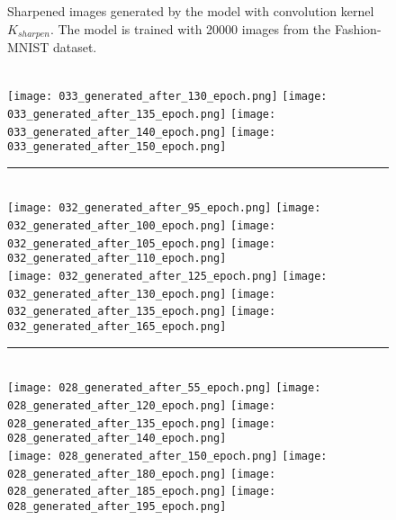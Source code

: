 \documentclass{article}
\begin{document}
\begin{figure}[!h]
\caption{Sharpened images generated by the model with convolution kernel $K_{sharpen}$. The model is trained with 20000 images from the Fashion-MNIST dataset.}
\label{fashion_sharpen}
\end{figure}


\begin{figure}[!h]
\centering
{}
\\
{
\texttt{[image: 033\_generated\_after\_130\_epoch.png]}
}
{
\texttt{[image: 033\_generated\_after\_135\_epoch.png]}
}
{
\texttt{[image: 033\_generated\_after\_140\_epoch.png]}
}
{
\texttt{[image: 033\_generated\_after\_150\_epoch.png]}
}

\rule{0.8\textwidth}{0.3mm}\\{
\texttt{[image: 032\_generated\_after\_95\_epoch.png]}
}{
\texttt{[image: 032\_generated\_after\_100\_epoch.png]}
}{
\texttt{[image: 032\_generated\_after\_105\_epoch.png]}
}{
\texttt{[image: 032\_generated\_after\_110\_epoch.png]}
}
\\
{
\texttt{[image: 032\_generated\_after\_125\_epoch.png]}
}
{
\texttt{[image: 032\_generated\_after\_130\_epoch.png]}
}
{
\texttt{[image: 032\_generated\_after\_135\_epoch.png]}
}
{
\texttt{[image: 032\_generated\_after\_165\_epoch.png]}
}

\rule{0.8\textwidth}{0.3mm}\\{
\texttt{[image: 028\_generated\_after\_55\_epoch.png]}
}{
\texttt{[image: 028\_generated\_after\_120\_epoch.png]}
}{
\texttt{[image: 028\_generated\_after\_135\_epoch.png]}
}{
\texttt{[image: 028\_generated\_after\_140\_epoch.png]}
}
\\
{
\texttt{[image: 028\_generated\_after\_150\_epoch.png]}
}
{
\texttt{[image: 028\_generated\_after\_180\_epoch.png]}
}
{
\texttt{[image: 028\_generated\_after\_185\_epoch.png]}
}
{
\texttt{[image: 028\_generated\_after\_195\_epoch.png]}
}


\end{figure}
\end{document}
